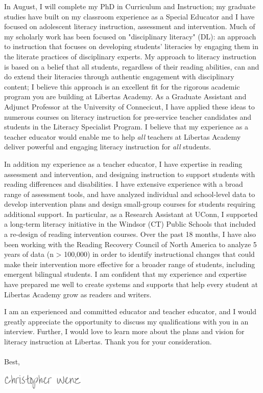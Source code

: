 \documentclass[11pt, a4paper]{awesome-cv}
\begin{document}
\begin{cvletter}
In August, I will complete my PhD in Curriculum and Instruction; my graduate studies have built on my classroom experience as a Special Educator and I have focused on adolescent literacy instruction, assessment and intervention. Much of my scholarly work has been focused on "disciplinary literacy" (DL): an approach to instruction that focuses on developing students' literacies by engaging them in the literate practices of disciplinary experts. My approach to literacy instruction is based on a belief that all students, regardless of their reading abilities, can and do extend their literacies through authentic engagement with disciplinary content; I believe this approach is an excellent fit for the rigorous academic program you are building at Libertas Academy. As a Graduate Assistant and Adjunct Professor at the University of Connecicut, I have applied these ideas to numerous courses on literacy instruction for pre-service teacher candidates and students in the Literacy Specialist Program. I believe that my experience as a teacher educator would enable me to help \emph{all} teachers at Libertas Academy deliver powerful and engaging literacy instruction for \emph{all} students. 

In addition my experience as a teacher educator, I have expertise in reading assessment and intervention, and designing instruction to support students with reading differences and disabilities. I have extensive experience with a broad range of assessment tools, and have analyzed individual and school-level data to develop intervention plans and design small-group courses for students requiring additional support. In particular, as a Research Assistant at UConn, I supported a long-term literacy initiative in the Windsor (CT) Public Schools that included a re-design of reading intervention courses. Over the past 18 months, I have also been working with the Reading Recovery Council of North America to analyze 5 years of data (n > 100,000) in order to identify instructional changes that could make their intervention more effective for a broader range of students, including emergent bilingual students. I am confident that my experience and expertise have prepared me well to create systems and supports that help every student at Libertas Academy grow as readers and writers. 

I am an experienced and committed educator and teacher educator, and I would greatly appreciate the opportunity to discuss my qualifications with you in an interview. Further, I would love to learn more about the plans and vision for literacy instruction at Libertas. Thank you for your consideration.  
\\\\
Best,
\end{cvletter}

\includegraphics[width=4cm, height=0.8cm]{./img/sig.png}
\end{document}
